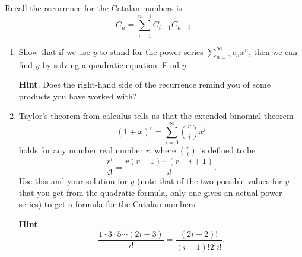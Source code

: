 \documentclass{book}
\begin{document}
\setcounter{cpjt}{271}
\addtocounter{cpjt}{-1}
\begin{activity}\label{CatalanRecurrence}
\hypertarget{p-1384}{}%
Recall the recurrence for the Catalan numbers is%
\begin{equation*}
C_n = \sum_{i=1}^{n-1} C_{i-1}C_{n-i}\text{.}
\end{equation*}
%
\begin{enumerate}[font=\bfseries,label=(\alph*),ref=\alph*]
\item\label{task-252} \hypertarget{p-1385}{}%
Show that if we use \(y\) to stand for the power series \(\sum_{n=0}^\infty c_nx^n\), then we can find \(y\) by solving a quadratic equation. Find \(y\).%
\par\smallskip%
\noindent\textbf{Hint}.\hypertarget{hint-174}{}\quad%
\hypertarget{p-1386}{}%
Does the right-hand side of the recurrence remind you of some products you have worked with?%
\par\smallskip%
\noindent\item\label{task-253} \hypertarget{p-1388}{}%
Taylor's theorem from calculus tells us that the extended binomial theorem%
\begin{equation*}
(1+x)^r = \sum_{i=0}^\infty \binom{r}{i}x^i
\end{equation*}
holds for any number real number \(r\), where \(\binom{r}{i}\) is defined to be%
\begin{equation*}
\frac{r^{\underline{i}}}{i!} = \frac{r(r-1)\cdots(r-i+1)}{i!}\text{.}
\end{equation*}
Use this and your solution for \(y\) (note that of the two possible values for \(y\) that you get from the quadratic formula, only one gives an actual power series) to get a formula for the Catalan numbers.%
\par\smallskip%
\noindent\textbf{Hint}.\hypertarget{hint-175}{}\quad%
\hypertarget{p-1389}{}%
%
\begin{equation*}
\frac{1\cdot 3\cdot 5\cdots (2i-3)}{i!} = \frac{(2i-2)!}{(i-1)!2^i i!}\text{.}
\end{equation*}
%
\par\smallskip%
\noindent\end{enumerate}
\end{activity}

\clearpage
\end{document}
